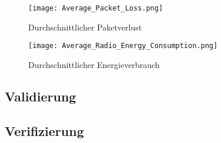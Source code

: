 \begin{figure}[!htbp]
\centering
\begin{minipage}[b]{0.49\textwidth}
		\centering
		\texttt{[image: Average\_Packet\_Loss.png]}
		\caption{Durchschnittlicher Paketverlust}
		\label{fig:DurchschnittlicherPaketverlust}
\end{minipage}
\begin{minipage}[b]{0.49\textwidth}
		\centering
		\texttt{[image: Average\_Radio\_Energy\_Consumption.png]}
		\caption{Durchschnittlicher Energieverbrauch}
		\label{fig:DurchschnittlicherEnergieverbrauch}
\end{minipage}
\end{figure}


\subsection{Validierung}\label{subsec:Validierung}


\subsection{Verifizierung}\label{subsec:Verifizierung}





